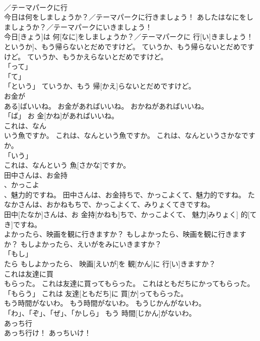 \documentclass[8pt]{extreport}
\begin{document}
\begin{CJK}{UTF8}{min}
\\	／テーマパークに行
\\	今日は何をしましょうか？／テーマパークに行きましょう！	あしたはなにをしましょうか？／テーマパークにいきましょう！	
\\	今日[きょう]は 何[なに]をしましょうか？／テーマパークに 行[い]きましょう！		
\\	というか]、もう帰らないとだめですけど。	ていうか、もう帰らないとだめですけど。	ていうか、もうかえらないとだめですけど。	
\\	「って」 
\\	「て」 
\\	「という」	ていうか、もう 帰[かえ]らないとだめですけど。		
\\	お金が
\\	ある]ばいいね。	お金があればいいね。	おかねがあればいいね。	
\\	「ば」	お 金[かね]があればいいね。		
\\	これは、なん
\\	いう魚ですか。	これは、なんという魚ですか。	これは、なんというさかなですか。	
\\	「いう」 
\\	これは、なんという 魚[さかな]ですか。		
\\	田中さんは、お金持
\\	、かっこよ
\\	、魅力的ですね。	田中さんは、お金持ちで、かっこよくて、魅力的ですね。	たなかさんは、おかねもちで、かっこよくて、みりょくてきですね。	
\\	田中[たなか]さんは、お 金持[かねも]ちで、かっこよくて、 魅力[みりょく] 的[てき]ですね。		
\\	よかったら、映画を観に行きますか？	もしよかったら、映画を観に行きますか？	もしよかったら、えいがをみにいきますか？	
\\	「もし」 
\\	たら	もしよかったら、 映画[えいが]を 観[かん]に 行[い]きますか？		
\\	これは友達に買
\\	もらった。	これは友達に買ってもらった。	これはともだちにかってもらった。	
\\	「もらう」	これは 友達[ともだち]に 買[か]ってもらった。		
\\	もう時間がないわ。	もう時間がないわ。	もうじかんがないわ。	
\\	「わ」、「ぞ」、「ぜ」、「かしら」	もう 時間[じかん]がないわ。		
\\	あっち行
\\	あっち行け！	あっちいけ！	

\end{CJK}
\end{document}
